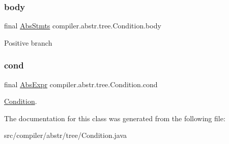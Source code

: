 \subsubsection{\texorpdfstring{body}{body}}
{\footnotesize\ttfamily final \hyperlink{classcompiler_1_1abstr_1_1tree_1_1_abs_stmts}{Abs\+Stmts} compiler.\+abstr.\+tree.\+Condition.\+body}

Positive branch \mbox{\label{classcompiler_1_1abstr_1_1tree_1_1_condition_a0b23563b552baed42fce3b2878fdcb58}} 
\subsubsection{\texorpdfstring{cond}{cond}}
{\footnotesize\ttfamily final \hyperlink{classcompiler_1_1abstr_1_1tree_1_1expr_1_1_abs_expr}{Abs\+Expr} compiler.\+abstr.\+tree.\+Condition.\+cond}

\hyperlink{classcompiler_1_1abstr_1_1tree_1_1_condition}{Condition}. 

The documentation for this class was generated from the following file\+:\begin{DoxyCompactItemize}
\item 
src/compiler/abstr/tree/Condition.\+java\end{DoxyCompactItemize}
